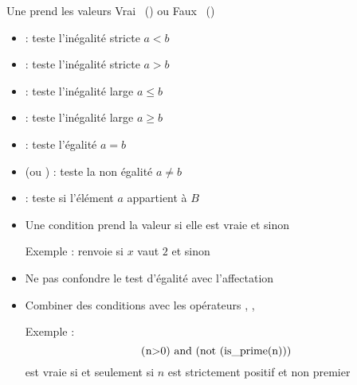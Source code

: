 \begin{frame}


\medskip
\pause

Une  prend 
les valeurs  \og Vrai \fg\ ()
ou \og Faux \fg\ ()


\bigskip
\pause


\pause

\begin{itemize}[<+->]
  \item {} : teste l'inégalité stricte $a<b$
  \item {} : teste l'inégalité stricte $a>b$
  \item {} : teste l'inégalité large $a\le b$
  \item {} : teste l'inégalité large $a\ge b$
  \item {} : teste l'égalité $a=b$
  \item {} (ou ) : teste la non égalité $a\neq b$
  \item {} : teste si l'élément $a$ appartient à $B$
\end{itemize}

\end{frame}


\begin{frame}

\begin{remarque}  
\pause 
\begin{itemize}
  \item Une condition prend la valeur  
  si elle est vraie et  sinon

  \pause  
\smallskip

Exemple :  renvoie  si $x$ vaut $2$ et  sinon

\medskip
\pause

  \item Ne pas confondre le test d'égalité
 avec l'affectation  

\pause
\medskip


  \item Combiner des conditions avec les opérateurs ,
  ,  
  
\smallskip
\pause

  Exemple :
  $$\mbox{\codeinline{ (n>0) and (not (is_prime(n))) }}$$
 est vraie
  si et seulement si $n$ est strictement positif et non premier
  
\end{itemize}  
\end{remarque}
\end{frame}


